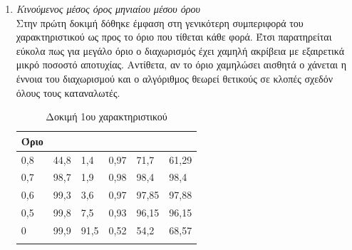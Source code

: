 \begin{enumerate}
\item{\textit{Κινούμενος μέσος όρος μηνιαίου μέσου όρου}} \\
Στην πρώτη δοκιμή δόθηκε έμφαση στη γενικότερη συμπεριφορά του χαρακτηριστικού ως προς το όριο που τίθεται κάθε φορά. Έτσι παρατηρείται εύκολα πως για μεγάλο όριο ο διαχωρισμός έχει χαμηλή ακρίβεια με εξαιρετικά μικρό ποσοστό αποτυχίας. Αντίθετα, αν το όριο χαμηλώσει αισθητά ο χάνεται η έννοια του διαχωρισμού και ο αλγόριθμος θεωρεί θετικούς σε κλοπές σχεδόν όλους τους καταναλωτές.
\begin{center}
\begin{longtabu}  to 0.8\textwidth { | X[c] || X[c] | X[c] | X[c] | X[c] | X[c] |  }
 \hline
  Όριο &   &  &  &  & \\
 ,8&	44,8&	1,4	&0,97	&71,7&	61,29\\
0,7&	98,7&	1,9	&0,98	&98,4&	98,4\\
0,6&	99,3&	3,6&	0,97&	97,85&	97,88\\
0,5&	99,8&	7,5	&0,93	&96,15&	96,15\\
0&	99,9&	91,5	&0,52	&54,2&	68,57\\
\hline
\caption{Δοκιμή 1ου χαρακτηριστικού}
\label{testfeat1}
\end{longtabu}
\end{center}


\end{enumerate}
